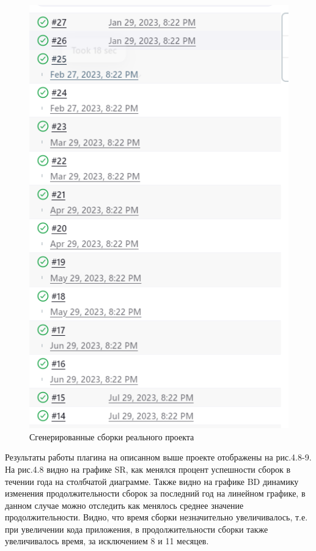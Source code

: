  \begin{figure}[ht!] 
	\center
	\includegraphics [scale=0.67] {my_folder/images//genetatedBuild}
	\caption{Сгенерированные сборки реального проекта} 
	\label{fig:genetatedBuild}  
\end{figure}

Результаты работы плагина на описанном выше проекте отображены на рис.4.8-9. На рис.4.8 видно на графике SR, как менялся процент успешности сборок в течении года на столбчатой диаграмме. Также видно на графике BD динамику изменения продолжительности сборок за последний год на линейном графике, в данном случае можно отследить как менялось среднее значение продолжительности. Видно, что время сборки незначительно увеличивалось, т.е. при увеличении кода приложения, в продолжительности сборки также увеличивалось время, за исключением 8 и 11 месяцев. 


